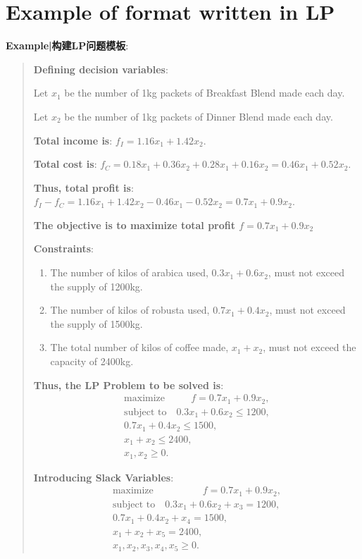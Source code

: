 \documentclass[9pt]{article}
\begin{document}
\section{Example of format written in LP}

\textbf{Example|构建LP问题模板}:

\vspace{-10pt}
\begin{multicols}{2}
\begin{quote}
    \color{gray}
    \fontsize{7pt}{5pt}\selectfont
    \textbf{Defining decision variables}:

    \quad Let $x_1$ be the number of 1kg packets of Breakfast Blend made each day.

    \quad Let $x_2$ be the number of 1kg packets of Dinner Blend made each day.
    
    \textbf{Total income is}: $f_I = 1.16x_1 + 1.42x_2.$

    \textbf{Total cost is}: $f_C = 0.18x_1 + 0.36x_2 + 0.28x_1 + 0.16x_2 = 0.46x_1 + 0.52x_2.$

    \textbf{Thus, total profit is}:$f_I - f_C = 1.16x_1 + 1.42x_2 - 0.46x_1 - 0.52x_2 = 0.7x_1 + 0.9x_2.$

    \textbf{The objective is to maximize total profit \( f = 0.7x_1 + 0.9x_2 \)}

    \textbf{Constraints}:
    \begin{enumerate}[itemsep=-1pt, topsep=-1pt]
        \item The number of kilos of arabica used, \( 0.3x_1 + 0.6x_2 \), must not exceed the supply of 1200kg.
        \item The number of kilos of robusta used, \( 0.7x_1 + 0.4x_2 \), must not exceed the supply of 1500kg.
        \item The total number of kilos of coffee made, \( x_1 + x_2 \), must not exceed the capacity of 2400kg.
    \end{enumerate}
    
    \textbf{Thus, the LP Problem to be solved is}:
    \[
    \begin{aligned}
        \text{maximize} \qquad \ \ \ f = 0.7x_1 + 0.9x_2, \\
        \text{subject to} \quad 0.3x_1 + 0.6x_2 \leq 1200, \\
        0.7x_1 + 0.4x_2 \leq 1500, \\
        x_1 + x_2 \leq 2400, \\
        x_1, x_2 \geq 0.
    \end{aligned}
    \]
    
    \textbf{Introducing Slack Variables}:  
    \[
    \begin{aligned}
        \text{maximize} \qquad \qquad \quad f = 0.7x_1 + 0.9x_2, \\
        \text{subject to} \quad 0.3x_1 + 0.6x_2 + x_3 = 1200, \\
        0.7x_1 + 0.4x_2 + x_4 = 1500, \\
        x_1 + x_2 + x_5 = 2400, \\
        x_1, x_2, x_3, x_4, x_5 \geq 0.
    \end{aligned}
    \]
\end{quote}
\end{multicols}
\vspace{-10pt}
\end{document}
